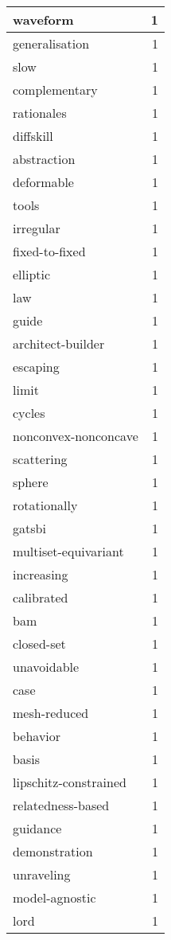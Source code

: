 \begin{table}[h]
\begin{tabular}{|l|r|}
\hline
waveform & 1 \\
\hline
generalisation & 1 \\
\hline
slow & 1 \\
\hline
complementary & 1 \\
\hline
rationales & 1 \\
\hline
diffskill & 1 \\
\hline
abstraction & 1 \\
\hline
deformable & 1 \\
\hline
tools & 1 \\
\hline
irregular & 1 \\
\hline
fixed-to-fixed & 1 \\
\hline
elliptic & 1 \\
\hline
law & 1 \\
\hline
guide & 1 \\
\hline
architect-builder & 1 \\
\hline
escaping & 1 \\
\hline
limit & 1 \\
\hline
cycles & 1 \\
\hline
nonconvex-nonconcave & 1 \\
\hline
scattering & 1 \\
\hline
sphere & 1 \\
\hline
rotationally & 1 \\
\hline
gatsbi & 1 \\
\hline
multiset-equivariant & 1 \\
\hline
increasing & 1 \\
\hline
calibrated & 1 \\
\hline
bam & 1 \\
\hline
closed-set & 1 \\
\hline
unavoidable & 1 \\
\hline
case & 1 \\
\hline
mesh-reduced & 1 \\
\hline
behavior & 1 \\
\hline
basis & 1 \\
\hline
lipschitz-constrained & 1 \\
\hline
relatedness-based & 1 \\
\hline
guidance & 1 \\
\hline
demonstration & 1 \\
\hline
unraveling & 1 \\
\hline
model-agnostic & 1 \\
\hline
lord & 1 \\
\hline

\end{tabular}
\end{table}
